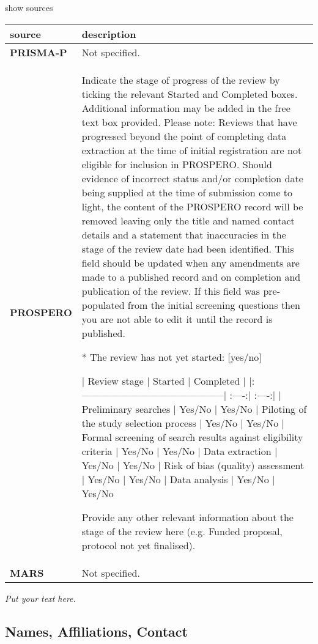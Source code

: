 \documentclass[]{article}
\begin{document}
show sources

\hypertarget{sor}{}
\begin{table}[H]
\centering
\begin{tabular}{>{\bfseries}l|l}
\hline
\rowcolor[HTML]{ececec}  source & description\\
\hline
PRISMA-P & Not specified.\\
\hline
PROSPERO & Indicate the stage of progress of the review by ticking the relevant Started and Completed boxes. Additional
information may be added in the free text box provided.
Please note: Reviews that have progressed beyond the point of completing data extraction at the time of
initial registration are not eligible for inclusion in PROSPERO. Should evidence of incorrect status and/or
completion date being supplied at the time of submission come to light, the content of the PROSPERO
record will be removed leaving only the title and named contact details and a statement that inaccuracies in
the stage of the review date had been identified.
This field should be updated when any amendments are made to a published record and on completion and
publication of the review. If this field was pre-populated from the initial screening questions then you are not
able to edit it until the record is published.

* The review has not yet started: [yes/no]

| Review stage | Started | Completed |
|:--------------------------------------------| :----:| :----:|
| Preliminary searches | Yes/No | Yes/No
| Piloting of the study selection process | Yes/No | Yes/No
| Formal screening of search results against eligibility criteria | Yes/No | Yes/No
| Data extraction | Yes/No | Yes/No
| Risk of bias (quality) assessment | Yes/No | Yes/No
| Data analysis | Yes/No | Yes/No

Provide any other relevant information about the stage of the review here (e.g. Funded proposal, protocol not
yet finalised).\\
\hline
MARS & Not specified.\\
\hline
\end{tabular}
\end{table}

\emph{Put your text here.}

\hypertarget{names-affiliations-contact}{%
\subsection{Names, Affiliations,
Contact}\label{names-affiliations-contact}}
\end{document}

